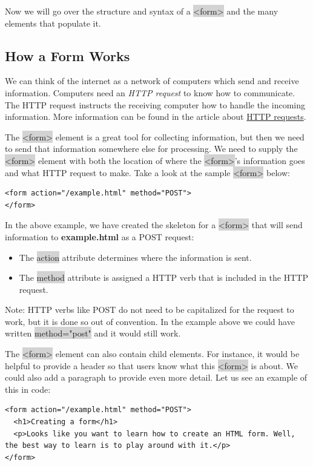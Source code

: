 \documentclass[11pt]{article}
\begin{document}
Now we will go over the structure and syntax of a \colorbox{lightgray}{<form>} and the many elements that populate it.

\subsection{How a Form Works}
We can think of the internet as a network of computers which send and receive information. Computers need an \textit{HTTP request} to know how to communicate. The HTTP request instructs the receiving computer how to handle the incoming information. More information can be found in the article about \href{https://www.codecademy.com/articles/http-requests}{HTTP requests}.

The \colorbox{lightgray}{<form>} element is a great tool for collecting information, but then we need to send that information somewhere else for processing. We need to supply the \colorbox{lightgray}{<form>} element with both the location of where the \colorbox{lightgray}{<form>}'s information goes and what HTTP request to make. Take a look at the sample \colorbox{lightgray}{<form>} below:
\begin{lstlisting}
<form action="/example.html" method="POST">
</form>
\end{lstlisting}
In the above example, we have created the skeleton for a \colorbox{lightgray}{<form>} that will send information to \textbf{example.html} as a POST request:
\begin{itemize}[leftmargin = *]
\item The \colorbox{lightgray}{action} attribute determines where the information is sent.
\item The \colorbox{lightgray}{method} attribute is assigned a HTTP verb that is included in the HTTP request.
\end{itemize}
Note: HTTP verbs like POST do not need to be capitalized for the request to work, but it is done so out of convention. In the example above we could have written \colorbox{lightgray}{method="post"} and it would still work.

The \colorbox{lightgray}{<form>} element can also contain child elements. For instance, it would be helpful to provide a header so that users know what this \colorbox{lightgray}{<form>} is about. We could also add a paragraph to provide even more detail. Let us see an example of this in code:
\begin{lstlisting}
<form action="/example.html" method="POST">
  <h1>Creating a form</h1>
  <p>Looks like you want to learn how to create an HTML form. Well, the best way to learn is to play around with it.</p>
</form>
\end{lstlisting}
\end{document}

